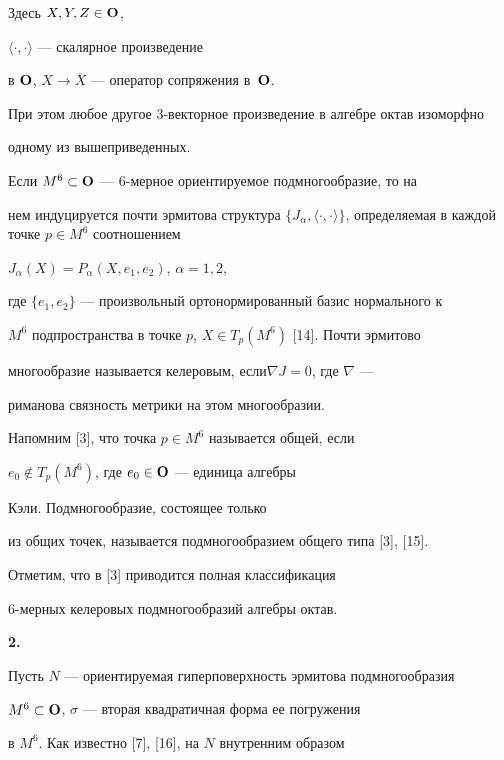 Здесь $X,Y,Z \in \bold O$,


$\langle\cdot,\cdot\rangle$ --- скалярное произведение


в $\bold O$, $X \rightarrow \overline X$ --- оператор сопряжения в~$\bold O$.


При этом любое другое 3-векторное произведение в алгебре октав изоморфно 


одному из вышеприведенных.





Если $M^6 \subset \bold O$ --- 6-мерное ориентируемое подмногообразие, то на 


нем индуцируется почти эрмитова структура $\{J_{\alpha}, \langle\cdot,


\cdot\rangle\}$, определяемая в каждой точке $p\in M^6$ соотношением


$J_{\alpha}(X)=P_{\alpha}(X,e_1,e_2)$, $\alpha=1,2$,


где $\{e_1,e_2\}$ --- произвольный ортонормированный базис нормального к


$M^6$ подпространства в точке $p$, $X\in T_p(M^6)$ [14]. Почти эрмитово


многообразие называется келеровым, если$\nabla J=0$, где $\nabla$ ---


риманова связность метрики на этом многообразии.





Напомним [3], что точка $p\in M^6$ называется общей, если


$e_0\notin T_p(M^6)$, где $e_0\in \bold O$ --- единица алгебры 


Кэли. Подмногообразие, состоящее только


из общих точек, называется подмногообразием общего типа [3], [15].


Отметим, что в [3] приводится полная классификация


6-мерных келеровых подмногообразий алгебры октав.


\medskip





{\bf 2.}


Пусть $N$ --- ориентируемая гиперповерхность эрмитова подмногообразия


$M^6\subset\bold O$, $\sigma$ --- вторая квадратичная форма ее погружения


в $M^6$. Как известно [7], [16], на $N$ внутренним образом 


